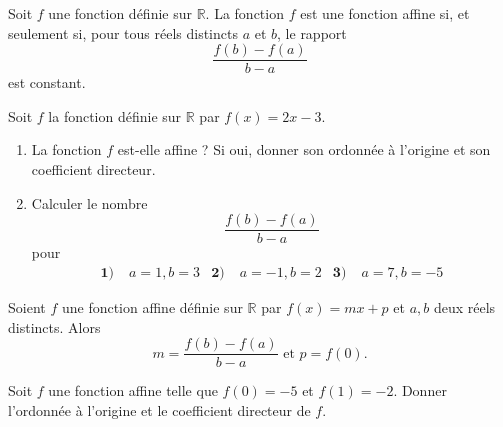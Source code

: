 \documentclass[11pt]{article}
\begin{document}
\begin{prop}
  \begin{minipage}[]{.5\textwidth}
  Soit $f$ une fonction définie sur $\mathbb{R}$. La fonction $f$ est une
  fonction affine si, et seulement si, pour tous réels distincts $a$ et $b$, le
  rapport
  \[
    \frac{f(b)-f(a)}{b-a}
  \]
  est constant.
  \end{minipage}
  \begin{minipage}[]{.5\textwidth}
    \begin{center}
    \end{center}
  \end{minipage}
\end{prop}

\begin{app}
  Soit $f$ la fonction définie sur $\mathbb{R}$ par $f(x)=2x-3$.
  \begin{enumerate}
    \item La fonction $f$ est-elle affine ? Si oui, donner son ordonnée à
      l'origine et son coefficient directeur.
    \item Calculer le nombre 
  \[
    \frac{f(b)-f(a)}{b-a}
  \]
  pour
  \begin{align*}
    \textbf{1)}\;& a=1, b=3 &
    \textbf{2)}\;& a=-1, b=2 &
    \textbf{3)}\;& a=7, b=-5
  \end{align*}
  \end{enumerate}
\end{app}

\begin{prop}
  Soient $f$ une fonction affine définie sur $\mathbb{R}$ par $f(x)=mx+p$ et $a,
  b$ deux réels distincts. Alors
  \[
    m=\frac{f(b)-f(a)}{b-a}\text{ et } p = f(0).
  \]
\end{prop}

\begin{app}
  Soit $f$ une fonction affine telle que $f(0)=-5$ et $f(1)=-2$. Donner
  l'ordonnée à l'origine et le coefficient directeur de $f$.
\end{app}
\end{document}

